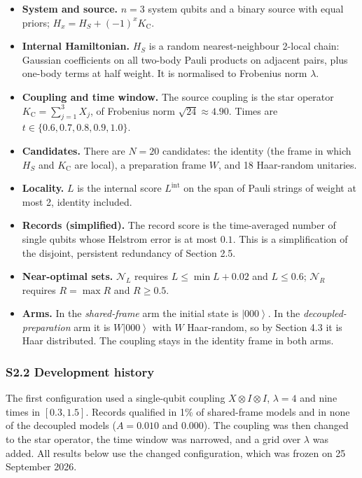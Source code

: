 \documentclass[
  10pt,
  a4paper,
]{article}
\providecommand{\tightlist}{%
  \setlength{\itemsep}{0pt}\setlength{\parskip}{0pt}}
\begin{document}
\begin{itemize}
\tightlist
\item
  \textbf{System and source.} \(n=3\) system qubits and a binary source
  with equal priors; \(H_x=H_S+(-1)^xK_{\mathrm C}\).
\item
  \textbf{Internal Hamiltonian.} \(H_S\) is a random nearest-neighbour
  2-local chain: Gaussian coefficients on all two-body Pauli products on
  adjacent pairs, plus one-body terms at half weight. It is normalised
  to Frobenius norm \(\lambda\).
\item
  \textbf{Coupling and time window.} The source coupling is the star
  operator \(K_{\mathrm C}=\sum_{j=1}^3X_j\), of Frobenius norm
  \(\sqrt{24}\approx4.90\). Times are \(t\in\{0.6,0.7,0.8,0.9,1.0\}\).
\item
  \textbf{Candidates.} There are \(N=20\) candidates: the identity (the
  frame in which \(H_S\) and \(K_{\mathrm C}\) are local), a preparation
  frame \(W\), and 18 Haar-random unitaries.
\item
  \textbf{Locality.} \(L\) is the internal score \(L^{\mathrm{int}}\) on
  the span of Pauli strings of weight at most 2, identity included.
\item
  \textbf{Records (simplified).} The record score is the time-averaged
  number of single qubits whose Helstrom error is at most \(0.1\). This
  is a simplification of the disjoint, persistent redundancy of Section
  2.5.
\item
  \textbf{Near-optimal sets.} \(\mathcal N_L\) requires
  \(L\le\min L+0.02\) and \(L\le0.6\); \(\mathcal N_R\) requires
  \(R=\max R\) and \(R\ge0.5\).
\item
  \textbf{Arms.} In the \emph{shared-frame} arm the initial state is
  \(\left| 000\right\rangle\). In the \emph{decoupled-preparation} arm
  it is \(W\left| 000\right\rangle\) with \(W\) Haar-random, so by
  Section 4.3 it is Haar distributed. The coupling stays in the identity
  frame in both arms.
\end{itemize}

\subsubsection{S2.2 Development history}\label{s2.2-development-history}

The first configuration used a single-qubit coupling
\(X\otimes I\otimes I\), \(\lambda=4\) and nine times in \([0.3,1.5]\).
Records qualified in 1\% of shared-frame models and in none of the
decoupled models (\(A=0.010\) and \(0.000\)). The coupling was then
changed to the star operator, the time window was narrowed, and a grid
over \(\lambda\) was added. All results below use the changed
configuration, which was frozen on 25 September 2026.
\end{document}
